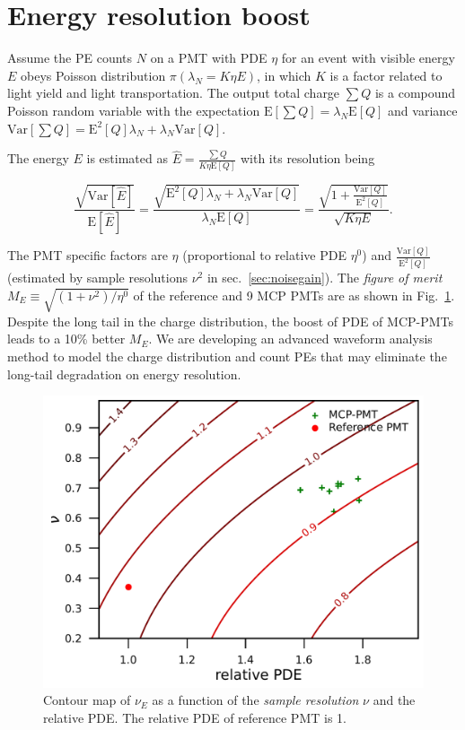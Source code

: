 \section{Energy resolution boost}
\label{Result}
Assume the PE counts $N$ on a PMT with PDE $\eta$ for an event with visible energy $E$ obeys Poisson distribution $\pi(\lambda_N=K\eta E)$, in which $K$ is a factor related to light yield and light transportation. The output total charge $\sum{Q}$ is a compound Poisson random variable with the expectation $\mathrm{E}[\sum{Q}]=\lambda_N\mathrm{E}[Q]$ and variance $\mathrm{Var}[\sum{Q}]=\mathrm{E}^2[Q]\lambda_N+\lambda_N\mathrm{Var}[Q]$.

The energy $E$ is estimated as $\hat{E}=\frac{\sum{Q}}{K\eta\mathrm{E}[Q]}$ with its resolution being

\begin{equation}
    \frac{\sqrt{\mathrm{Var}[\hat{E}]}}{\mathrm{E}[\hat{E}]}=\frac{\sqrt{\mathrm{E}^2[Q]\lambda_N+\lambda_N\mathrm{Var}[Q]}}{\lambda_N\mathrm{E}[Q]}=\frac{\sqrt{1+\frac{\mathrm{Var}[Q]}{\mathrm{E}^2[Q]}}}{\sqrt{K\eta E}}.
\end{equation}

The PMT specific factors are $\eta$ (proportional to relative PDE $\eta^0$) and $\frac{\mathrm{Var}[Q]}{\mathrm{E}^2[Q]}$ (estimated by sample resolutions $\nu^2$ in sec.~\ref{sec:noisegain}). The \emph{figure of merit} $M_{E}\equiv\sqrt{({1+\nu^2})/{\eta^0}}$ of the reference and 9 MCP PMTs are as shown in Fig.~\ref{fig:EnergyResolution}. Despite the long tail in the charge distribution, the boost of PDE of MCP-PMTs leads to a 10\% better $M_{E}$. We are developing an advanced waveform analysis method to model the charge distribution and count PEs that may eliminate the long-tail degradation on energy resolution.
\begin{figure}[!htbp]
    \centering
    \includegraphics[width=\MF\textwidth]{figures/result/resolution.pdf}
    \caption{Contour map of $\nu_{E}$ as a function of the \emph{sample resolution} $\nu$ and the relative PDE. The relative PDE of reference PMT is 1.}
    \label{fig:EnergyResolution}
\end{figure}
